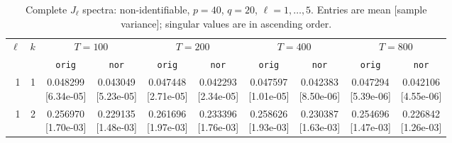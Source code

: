 \documentclass[12pt,letterpaper]{article}
\def\spacingset#1{\renewcommand{\baselinestretch}{#1}\small\normalsize}
\theoremstyle{plain}
\theoremstyle{definition}
\begin{document}
\clearpage
\begin{table}[p]
\begingroup
\spacingset{1.0}
\small\centering
\caption{Complete $J_\ell$ spectra: non-identifiable, $p=40$, $q=20$, $\ell=1,\ldots,5$. Entries are mean [sample variance]; singular values are in ascending order.}
\label{s23:lambda:alltab:spectra:p40q20exterior:1-5}
\footnotesize
\setlength{\tabcolsep}{2.2pt}
\renewcommand{\arraystretch}{1.03}
\begin{adjustbox}{max width=\linewidth}
\begin{tabular}{@{}rr*{8}{c}@{}}
\toprule
$\ell$ & $k$ & \multicolumn{2}{c}{$T=100$} & \multicolumn{2}{c}{$T=200$} & \multicolumn{2}{c}{$T=400$} & \multicolumn{2}{c}{$T=800$}\\
\cmidrule(lr){3-4}\cmidrule(lr){5-6}\cmidrule(lr){7-8}\cmidrule(lr){9-10}
 &  & \texttt{orig} & \texttt{nor} & \texttt{orig} & \texttt{nor} & \texttt{orig} & \texttt{nor} & \texttt{orig} & \texttt{nor}\\
\midrule
1 & 1 & \shortstack{0.048299\\[-1pt]{\scriptsize[6.34e-05]}} & \shortstack{0.043049\\[-1pt]{\scriptsize[5.23e-05]}} & \shortstack{0.047448\\[-1pt]{\scriptsize[2.71e-05]}} & \shortstack{0.042293\\[-1pt]{\scriptsize[2.34e-05]}} & \shortstack{0.047597\\[-1pt]{\scriptsize[1.01e-05]}} & \shortstack{0.042383\\[-1pt]{\scriptsize[8.50e-06]}} & \shortstack{0.047294\\[-1pt]{\scriptsize[5.39e-06]}} & \shortstack{0.042106\\[-1pt]{\scriptsize[4.55e-06]}}\\
1 & 2 & \shortstack{0.256970\\[-1pt]{\scriptsize[1.70e-03]}} & \shortstack{0.229135\\[-1pt]{\scriptsize[1.48e-03]}} & \shortstack{0.261696\\[-1pt]{\scriptsize[1.97e-03]}} & \shortstack{0.233396\\[-1pt]{\scriptsize[1.76e-03]}} & \shortstack{0.258626\\[-1pt]{\scriptsize[1.93e-03]}} & \shortstack{0.230387\\[-1pt]{\scriptsize[1.63e-03]}} & \shortstack{0.254696\\[-1pt]{\scriptsize[1.47e-03]}} & \shortstack{0.226842\\[-1pt]{\scriptsize[1.26e-03]}}\\

\end{tabular}
\end{adjustbox}
\end{table}
\end{document}

